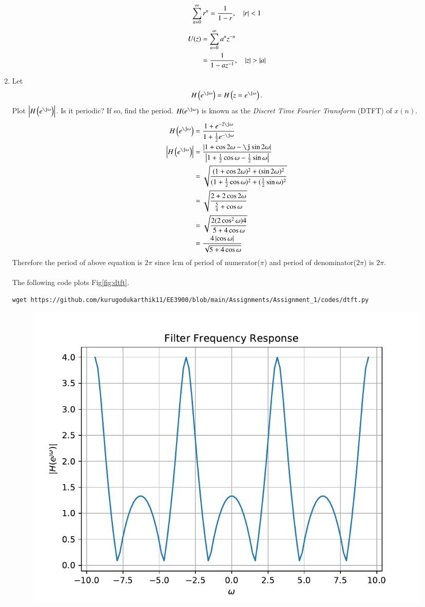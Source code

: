 \documentclass[journal,12pt,twocolumn]{IEEEtran}
\renewcommand\thesection{\arabic{section}}
\begin{document}
\begin{enumerate}[label=\thesection.\arabic*]
\begin{align}
\sum _{n= 0}^{\infty}r^n = \frac{1}{1-r}, \quad \left\vert r\right\vert < 1
\end{align}
\begin{align}
U(z) &= \sum _{n= 0}^{\infty}a^nz^{-n}
\\
&=\frac{1}{1-az^{-1}}, \quad \left\vert z\right\vert > \left\vert a\right\vert
\end{align}
%
\item 
Let
\begin{equation}
    H\brak{e^{\j \omega}} = H\brak{z = e^{\j \omega}}.
\end{equation}
Plot $\abs{H\brak{e^{\j \omega}}}$.  Is it periodic? If so, find the period. $H(e^{\j \omega})$ is
known as the {\em Discret Time Fourier Transform} (DTFT) of $x(n)$.
\\
\solution
\begin{align}
	H\brak{e^{\j \omega}} &= \frac{1+e^{-2\j\omega}}{1+\frac{1}{2} e^{-\j\omega}} \\
	\abs{H\brak{e^{\j \omega}}} &= \frac{\abs{1+\cos2\omega - \j\sin2\omega}}{\abs{1+\frac{1}{2} \cos\omega - \frac{1}{2} \sin\omega}} \\
	&= \sqrt{\frac{(1+\cos2\omega)^2 + (\sin2\omega)^2}{(1 + \frac{1}{2} \cos\omega)^2 + (\frac{1}{2}\sin\omega)^2}} \\
	&= \sqrt{\frac{2+2\cos2\omega}{\frac{5}{4}+\cos\omega}} \\
	&= \sqrt{\frac{2(2\cos^2\omega)4}{5+4\cos\omega} } \\
	&= \frac{4\abs{\cos\omega}}{\sqrt{5+4\cos\omega}}
\end{align} 
Therefore the period of above equation is $2\pi$ since lcm of period of numerator($\pi$) and period of denominator($2\pi$) is $2\pi$.\\
\\The following code plots Fig\ref{fig:dtft}.
\begin{lstlisting}
wget https://github.com/kurugodukarthik11/EE3900/blob/main/Assignments/Assignment_1/codes/dtft.py
\end{lstlisting}
\begin{figure}[!ht]
\centering
\includegraphics[width=\columnwidth]{./figs/dtft}

\end{figure}
\end{enumerate}
\end{document}
